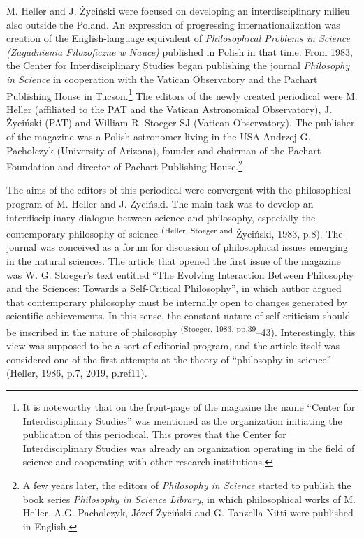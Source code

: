 \documentclass[a4paper]{article}
\newcommand\textstyleFootnoteSymbol[1]{\textsuperscript{#1}}
\begin{document}
M. Heller and J. Życiński were focused on developing an interdisciplinary milieu also outside the Poland. An expression
of progressing internationalization was creation of the English-language equivalent of \textit{Philosophical Problems
in Science (Zagadnienia Filozoficzne w Nauce) }published in Polish in that time. From 1983, the Center for
Interdisciplinary Studies began publishing the journal \textit{Philosophy in Science} in cooperation with the Vatican
Observatory and the Pachart Publishing House in Tucson.\footnote{ It is noteworthy that on the front-page of the
magazine the name “Center for Interdisciplinary Studies” was mentioned as the organization initiating the publication
of this periodical. This proves that the Center for Interdisciplinary Studies was already an organization operating in
the field of science and cooperating with other research institutions.} The editors of the newly created periodical
were M. Heller (affiliated to the PAT and the Vatican Astronomical Observatory), J. Życiński (PAT) and William R.
Stoeger SJ (Vatican Observatory). The publisher of the magazine was a Polish astronomer living in the USA Andrzej G.
Pacholczyk (University of Arizona), founder and chairman of the Pachart Foundation and director of Pachart Publishing
House.\footnote{ A few years later, the editors of \textit{Philosophy in Science} started to publish the book series
\textit{Philosophy in Science Library}, in which philosophical works of M. Heller, A.G. Pacholczyk, Józef Życiński and
G. Tanzella-Nitti were published in English.}

The aims of the editors of this periodical were convergent with the philosophical program of M. Heller and J. Życiński.
The main task was to develop an interdisciplinary dialogue between science and philosophy, especially the contemporary
philosophy of science \label{ref:RNDntZQ2V9XCR}\textstyleFootnoteSymbol{(Heller, Stoeger and }Życiński, 1983, p.8). The
journal was conceived as a forum for discussion of philosophical issues emerging in the natural sciences. The article
that opened the first issue of the magazine was W. G. Stoeger’s text entitled “The Evolving Interaction Between
Philosophy and the Sciences: Towards a Self-Critical Philosophy”, in which author argued that contemporary philosophy
must be internally open to changes generated by scientific achievements. In this sense, the constant nature of
self-criticism should be inscribed in the nature of philosophy
\label{ref:RNDbpNJI9xDEH}\textstyleFootnoteSymbol{(Stoeger, 1983, pp.39}–43). Interestingly, this view was supposed to
be a sort of editorial program, and the article itself was considered one of the first attempts at the theory of
“philosophy in science” \label{ref:RNDY3OAZaU25E}(Heller, 1986, p.7, 2019, p.ref11).
\end{document}
